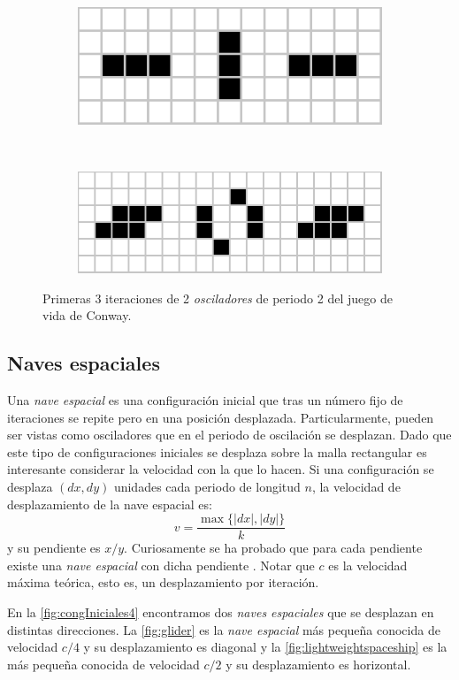 \documentclass[../proyecto.tex]{memoir}
\begin{document}
\begin{figure}[H]
	\centering
	\begin{subfigure}[b]{\linewidth} 
        \centering
        \includegraphics[height=.2\linewidth]{./images/blinker_evo.png}
        \caption{}
        \label{fig:blinker_evo}
    \end{subfigure}
    \\
	\begin{subfigure}[b]{\linewidth} 
        \centering
        \includegraphics[height=0.2\linewidth]{./images/toad_evo.png}
        \caption{}
        \label{fig:toad_evo}
    \end{subfigure}
	\caption{Primeras 3 iteraciones de 2 \textit{osciladores} de periodo 2 del juego de vida de Conway.}
	\label{fig:congIniciales3}
\end{figure} 

\subsection{Naves espaciales} \label{spaceships}

Una \textit{nave espacial} es una configuración inicial que tras un número fijo de iteraciones se repite pero en una posición desplazada. Particularmente, pueden ser vistas como osciladores que en el periodo de oscilación se desplazan. Dado que este tipo de configuraciones iniciales se desplaza sobre la malla rectangular es interesante considerar la velocidad con la que lo hacen. Si una configuración se desplaza $(dx, dy)$ unidades cada periodo de longitud $n$, la velocidad de desplazamiento de la nave espacial es: $$
 v = \frac{\max\{|dx|,|dy|\}}{k}
$$ 
y su pendiente es $x/y$. Curiosamente se ha probado que para cada pendiente existe una \textit{nave espacial} con dicha pendiente \cite{pendienteNaves}. Notar que $c$ es la velocidad máxima teórica, esto es, un desplazamiento por iteración.

En la \autoref{fig:congIniciales4} encontramos dos \textit{naves espaciales} que se desplazan en distintas direcciones. La \autoref{fig:glider} es la \textit{nave espacial} más pequeña conocida de velocidad $c/4$ y su desplazamiento es diagonal y la \autoref{fig:lightweightspaceship} es la más pequeña conocida de velocidad $c/2$ y su desplazamiento es horizontal.
\end{document}
